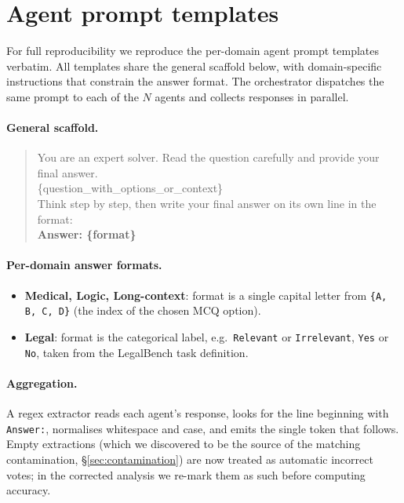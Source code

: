 \documentclass{article}
\begin{document}
\section{Agent prompt templates}
\label{app:prompts}

For full reproducibility we reproduce the per-domain agent prompt templates verbatim. All
templates share the general scaffold below, with domain-specific instructions that
constrain the answer format. The orchestrator dispatches the same prompt to each of the $N$
agents and collects responses in parallel.

\paragraph{General scaffold.}
\begin{quote}\small\ttfamily
You are an expert solver. Read the question carefully and provide your final answer.\\[2pt]
\{question\_with\_options\_or\_context\}\\[2pt]
Think step by step, then write your final answer on its own line in the format:\\
\textbf{Answer: \{format\}}
\end{quote}

\paragraph{Per-domain answer formats.}
\begin{itemize}
\item \textbf{Medical, Logic, Long-context}: format is a single capital letter from \texttt{\{A, B, C, D\}} (the index of the chosen MCQ option).
\item \textbf{Legal}: format is the categorical label, e.g.\ \texttt{Relevant} or \texttt{Irrelevant}, \texttt{Yes} or \texttt{No}, taken from the LegalBench task definition.
\end{itemize}

\paragraph{Aggregation.} A regex extractor reads each agent's response, looks for the line
beginning with \texttt{Answer:}, normalises whitespace and case, and emits the single token
that follows. Empty extractions (which we discovered to be the source of the matching
contamination, \S\ref{sec:contamination}) are now treated as automatic incorrect votes; in
the corrected analysis we re-mark them as such before computing accuracy.
\end{document}
